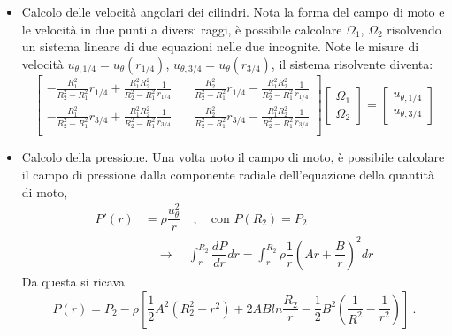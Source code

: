 \begin{itemize}
\item Calcolo delle velocità angolari dei cilindri. Nota la forma del campo di moto e
le velocità in due punti a diversi raggi, è possibile calcolare $\Omega_1$, $\Omega_2$
 risolvendo un sistema lineare di due equazioni nelle due incognite.
%
Note le misure di velocità $u_{\theta,1/4} = u_{\theta}(r_{1/4})$, $u_{\theta,3/4} = u_{\theta}(r_{3/4})$, il sistema risolvente diventa:
\begin{equation}
 \displaystyle\begin{bmatrix}
  -\frac{R_1^2}{R_2^2-R_1^2}r_{1/4} + \frac{R_1^2 R_2^2}{R_2^2-R_1^2}\frac{1}{r_{1/4}} & \quad
   \frac{R_2^2}{R_2^2-R_1^2}r_{1/4} - \frac{R_1^2 R_2^2}{R_2^2-R_1^2}\frac{1}{r_{1/4}} \\ 
  -\frac{R_1^2}{R_2^2-R_1^2}r_{3/4} + \frac{R_1^2 R_2^2}{R_2^2-R_1^2}\frac{1}{r_{3/4}} & \quad
   \frac{R_2^2}{R_2^2-R_1^2}r_{3/4} - \frac{R_1^2 R_2^2}{R_2^2-R_1^2}\frac{1}{r_{3/4}} \\
 \end{bmatrix}
 \displaystyle\begin{bmatrix}
  \Omega_1 \\ \Omega_2
 \end{bmatrix} =
 \displaystyle\begin{bmatrix}
  u_{\theta,1/4} \\ u_{\theta,3/4}
 \end{bmatrix}
\end{equation}


\item Calcolo della pressione. Una volta noto il campo di moto, è possibile calcolare il campo di pressione dalla componente radiale dell'equazione della quantità di moto,
\begin{equation}
\begin{aligned}
  P'(r) & = \rho \dfrac{u_\theta^2}{r} \quad , \quad \text{con $P(R_2) = P_2$} \\
 & \quad \rightarrow \quad
 \int_{r}^{R_2} \dfrac{dP}{dr} dr 
      = \int_r^{R_2} \rho \dfrac{1}{r} \left( A r + \dfrac{B}{r} \right)^2 dr
\end{aligned}
\end{equation}
%
Da questa si ricava
\begin{equation}
  P(r) = P_2 - \rho \left[ \dfrac{1}{2} A^2 (R_2^2 - r^2) + 2 A B ln \dfrac{R_2}{r} - 
      \dfrac{1}{2}B^2 \left( \dfrac{1}{R^2} - \dfrac{1}{r^2} \right)  \right] \ .
\end{equation}


\end{itemize}

